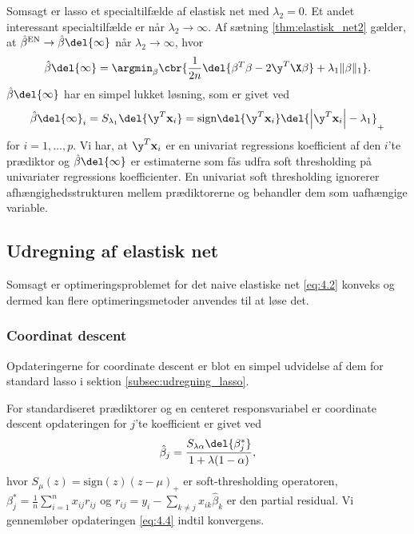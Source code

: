 Somsagt er lasso et specialtilfælde af elastisk net med \(\lambda_2=0\). 
Et andet interessant specialtilfælde er når \(\lambda_2 \rightarrow \infty\).
Af sætning \ref{thm:elastisk_net2} gælder, at \(\hat{\beta}^\text{EN} \rightarrow \hat{\beta} \del{\infty}\) når \(\lambda_2 \rightarrow \infty\), hvor
\begin{align*}
\hat{\beta} \del{\infty} = \argmin_\beta \cbr{\frac{1}{2n} \del{\beta^T \beta - 2 \y^T \X \beta} + \lambda_1 \Vert \beta \Vert_1}.
\end{align*}
\(\hat{\beta} \del{\infty}\) har en simpel lukket løsning, som er givet ved
\begin{align*}
\hat{\beta} \del{\infty}_i = S_{\lambda_1} \del{\y^T \mathbf{x}_i}=\text{sign} \del{\y^T \mathbf{x}_i} \del{\left\vert \y^T \mathbf{x}_i \right\vert - \lambda_1}_+
\end{align*}
for \(i = 1, \ldots, p\).
Vi har, at \(\y^T \mathbf{x}_i\) er en univariat regressions koefficient af den \(i\)'te prædiktor og \(\hat{\beta} \del{\infty}\) er estimaterne som fås udfra soft thresholding på univariater regressions koefficienter.
En univariat soft thresholding ignorerer afhængighedsstrukturen mellem prædiktorerne og behandler dem som uafhængige variable.

\subsection{Udregning af elastisk net}
Somsagt er optimeringsproblemet for det naive elastiske net \eqref{eq:4.2} konveks og dermed kan flere optimeringsmetoder anvendes til at løse det.

\subsubsection{Coordinat descent}
Opdateringerne for coordinate descent er blot en simpel udvidelse af dem for standard lasso i sektion \ref{subsec:udregning_lasso}.

For standardiseret prædiktorer og en centeret responsvariabel er coordinate descent opdateringen for $j$'te koefficient er givet ved
\begin{align}
\hat{\beta}_j = \frac{S_{\lambda \alpha} \del{\beta_j^*}}{1 + \lambda (1-\alpha)}, \label{eq:4.4}
\end{align}
hvor $S_\mu(z)=\text{sign}(z)(z-\mu)_+$ er soft-thresholding operatoren, \(\beta_j^* = \frac{1}{n} \sum_{i=1}^n x_{ij} r_{ij}\) og $r_{ij}=y_i - \sum_{k \neq j} x_{ik} \hat{\beta}_k$ er den partial residual. 
Vi gennemløber opdateringen \eqref{eq:4.4} indtil konvergens.

